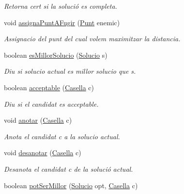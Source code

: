 \begin{DoxyCompactItemize}
\begin{DoxyCompactList}\small\item\em Retorna cert si la solució es completa. \end{DoxyCompactList}\item 
void \hyperlink{classlogica_1_1algoritmica_1_1_back_tracking_1_1_solucio_a277aadcd8caff5de312c5797ba9d4318}{assigna\+Punt\+A\+Fugir} (\hyperlink{classlogica_1_1_punt}{Punt} enemic)
\begin{DoxyCompactList}\small\item\em Assignacio del punt del cual volem maximitzar la distancia. \end{DoxyCompactList}\item 
boolean \hyperlink{classlogica_1_1algoritmica_1_1_back_tracking_1_1_solucio_a95cade88917d1b2e22f6d9506b33bd56}{es\+Millor\+Solucio} (\hyperlink{classlogica_1_1algoritmica_1_1_back_tracking_1_1_solucio}{Solucio} s)
\begin{DoxyCompactList}\small\item\em Diu si solucio actual es millor solucio que s. \end{DoxyCompactList}\item 
boolean \hyperlink{classlogica_1_1algoritmica_1_1_back_tracking_1_1_solucio_a19877137eeca065942f71091a0fb9d89}{acceptable} (\hyperlink{classlogica_1_1algoritmica_1_1_casella}{Casella} c)
\begin{DoxyCompactList}\small\item\em Diu si el candidat es acceptable. \end{DoxyCompactList}\item 
void \hyperlink{classlogica_1_1algoritmica_1_1_back_tracking_1_1_solucio_a7508629823fbebc6e4f72c5a1b796a6e}{anotar} (\hyperlink{classlogica_1_1algoritmica_1_1_casella}{Casella} c)
\begin{DoxyCompactList}\small\item\em Anota el candidat c a la solucio actual. \end{DoxyCompactList}\item 
void \hyperlink{classlogica_1_1algoritmica_1_1_back_tracking_1_1_solucio_a5d31926a0ae53314d9757bb3f560a69f}{desanotar} (\hyperlink{classlogica_1_1algoritmica_1_1_casella}{Casella} c)
\begin{DoxyCompactList}\small\item\em Desanota el candidat c de la solució actual. \end{DoxyCompactList}\item 
boolean \hyperlink{classlogica_1_1algoritmica_1_1_back_tracking_1_1_solucio_a0ff27b15c20bf53758fcc2c4cc4918a9}{pot\+Ser\+Millor} (\hyperlink{classlogica_1_1algoritmica_1_1_back_tracking_1_1_solucio}{Solucio} opt, \hyperlink{classlogica_1_1algoritmica_1_1_casella}{Casella} c)

\end{DoxyCompactItemize}
